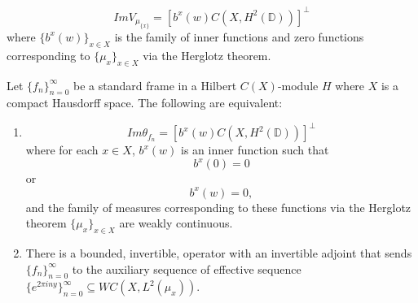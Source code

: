 \documentclass[10pt,a4paper]{amsart}
\begin{document}
\begin{thm}\label{imageNCT}
$$ImV_{\mu_{\{x\}}}=[b^{x}(w)C(X, H^{2}(\mathbb{D}))]^{\perp}$$ where $\{b^{x}(w)\}_{x\in X}$ is the family of inner functions and zero functions corresponding to $\{\mu_{x}\}_{x\in X}$ via the Herglotz theorem.
\end{thm}

\begin{cor}\label{equivalenttoauxcor}
Let $\{f_{n}\}_{n=0}^{\infty}$ be a standard frame in a Hilbert $C(X)$-module $H$ where $X$ is a compact Hausdorff space. The following are equivalent:

\begin{enumerate}
    \item $$Im\theta_{f_{n}}=[b^{x}(w)C(X, H^{2}(\mathbb{D}))]^{\perp}$$ where for each $x\in X$, $b^{x}(w)$ is an inner function such that $$b^{x}(0)=0$$ or $$b^{x}(w)=0,$$ and the family of measures corresponding to these functions via the Herglotz theorem $\{\mu_{x}\}_{x\in X}$ are weakly continuous.
    \item There is a bounded, invertible, operator with an invertible adjoint that sends $\{f_{n}\}_{n=0}^{\infty}$ to the auxiliary sequence of effective sequence $\{e^{2\pi i ny}\}_{n=0}^{\infty}\subseteq WC(X, L^{2}(\mu_{x}))$.
\end{enumerate}


\end{cor}
\end{document}
